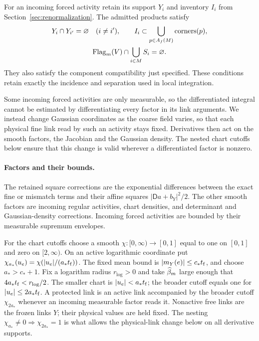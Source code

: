 For an incoming forced activity retain its support $Y_i$ and inventory $I_i$ from Section~\ref{sec:renormalization}. The admitted products satisfy
\begin{gather*}
Y_i\cap Y_{i'}=\varnothing\quad(i\ne i'),\qquad
I_i\subset\bigcup_{p\in A_f(M)}\operatorname{corners}(p),\\
\operatorname{Flag}_m(V)\cap\bigcup_{i\in M}S_i=\varnothing.
\end{gather*}
They also satisfy the component compatibility just specified. These conditions retain exactly the incidence and separation used in local integration.

Some incoming forced activities are only measurable, so the differentiated integral cannot be estimated by differentiating every factor in its link arguments. We instead change Gaussian coordinates as the coarse field varies, so that each physical fine link read by such an activity stays fixed. Derivatives then act on the smooth factors, the Jacobian and the Gaussian density. The nested chart cutoffs below ensure that this change is valid wherever a differentiated factor is nonzero.

\paragraph{Factors and their bounds.} The retained square corrections are the exponential differences between the exact fine or mismatch terms and their affine squares $|\mathsf Da+b_Y|^2/2$. The other smooth factors are incoming regular activities, chart densities, and determinant and Gaussian-density corrections. Incoming forced activities are bounded by their measurable supremum envelopes.

For the chart cutoffs choose a smooth $\chi:[0,\infty)\to[0,1]$ equal to one on $[0,1]$ and zero on $[2,\infty)$. On an active logarithmic coordinate put $\chi_{a_*}(u_e)=\chi(|u_e|/(a_*t_{\rm f}))$. The fixed mean bound is $|m_Y(e)|\le c_*t_{\rm f}$, and choose $a_*>c_*+1$. Fix a logarithm radius $r_{\log}>0$ and take $\widehat{\beta}_m$ large enough that $4a_*t_{\rm f}<r_{\log}/2$. The smaller chart is $|u_e|<a_*t_{\rm f}$; the broader cutoff equals one for $|u_e|\le2a_*t_{\rm f}$. A protected link is an active link accompanied by the broader cutoff $\chi_{2a_*}$ whenever an incoming measurable factor reads it. Nonactive free links are the frozen links $Y$; their physical values are held fixed. The nesting $\chi_{a_*}\ne0\Rightarrow\chi_{2a_*}=1$ is what allows the physical-link change below on all derivative supports.

